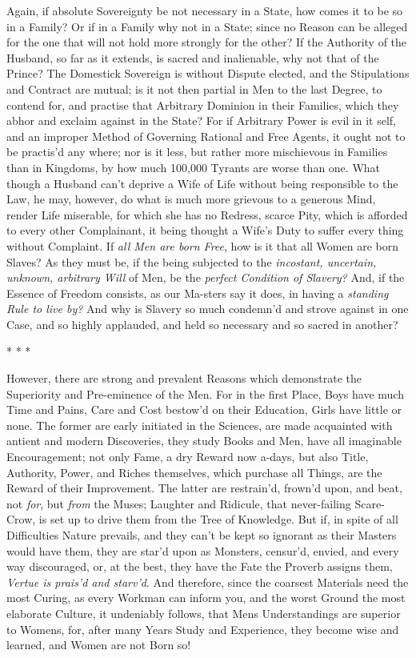 Again, if absolute Sovereignty be not necessary in a State, how comes
it to be so in a Family? Or if in a Family why not in a State; since
no Reason can be alleged for the one that will not hold more strongly
for the other? If the Authority of the Husband, so far as it extends,
is sacred and inalienable, why not that of the Prince? The Domestick
Sovereign is without Dispute elected, and the Stipulations and
Contract are mutual; is it not then partial in Men to the last Degree,
to contend for, and practise  that Arbitrary Dominion in
their Families, which they abhor and exclaim against in the State? For
if Arbitrary Power is evil in it self, and an improper Method of
Governing Rational and Free Agents, it ought not to be practis'd any
where; nor is it less, but rather more mischievous in Families than in
Kingdoms, by how much 100,000 Tyrants are worse than one. What though
a Husband can't deprive a Wife of Life without being responsible to
the Law, he may, however, do what is much more grievous to a generous
Mind, render Life miserable, for which she has no Redress, scarce
Pity, which is afforded to every other Complainant, it being thought a
Wife's Duty to suffer every thing without Complaint. If \textit{all
Men are born Free}, how is it that all Women are born Slaves? As they
must be, if the being subjected to the \textit{incostant, uncertain,
unknown, arbitrary Will} of Men, be the \textit{perfect Condition of
Slavery?} And, if the Essence of Freedom consists, as our
Ma-sters say it does, in having a \textit{standing Rule to
live by?} And why is Slavery so much condemn'd and strove against in
one Case, and so highly applauded, and held so necessary and so sacred
in another?

\begin{center}* * *\end{center}

However, there are strong and prevalent Reasons which
demonstrate the Superiority and Pre-eminence of the Men. 
For in the first Place, Boys have much Time and Pains, Care and Cost
bestow'd on their Education, Girls have little or none. The former are
early initiated in the Sciences, are made acquainted with antient
and modern Discoveries, they study Books and Men, have all imaginable
Encouragement; not only Fame, a dry Reward now a-days, but also Title,
Authority, Power, and Riches themselves, which purchase all Things,
are the Reward of their Improvement. The latter are restrain'd,
frown'd upon, and beat, not \textit{for}, but \textit{from} the Muses;
Laughter and Ridicule, that never-failing Scare-Crow, is set up to
drive them from the Tree of Knowledge. But if, in spite of all
Difficulties Nature prevails, and they can't be kept so ignorant as
their Masters would have them, they are star'd upon as Monsters,
censur'd, envied, and every way discouraged, or, at the best, they
have the Fate the Proverb assigns them, \textit{Vertue is prais'd and
starv'd}. And therefore, since the coarsest  Materials need
the most Curing, as every Workman can inform you, and the worst
Ground the most elaborate Culture, it undeniably follows, that Mens
Understandings are superior to Womens, for, after many Years Study and
Experience, they become wise and learned, and Women are not Born so!

